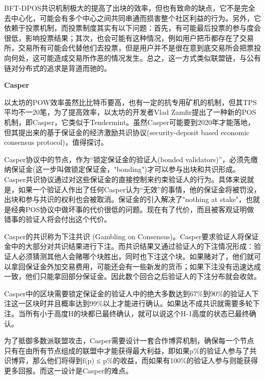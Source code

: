 \documentclass[a4paper,12pt]{article}
\begin{document}
BFT-DPOS共识机制极大的提高了出块的效率，但也有致命的缺点，它不是完全去中心化，可能会有多个中心之间共同串通而损害整个社区利益的行为。另外，它依赖于投票机制，而投票制度其实有以下问题：首先，有可能最后投票的参与度会很低，影响投票结果；其次，也会可能有这种情况，例如用户把币都存在了交易所，交易所有可能会代替他们去投票，但是用户并不是很在意到底交易所会把票投向何处，这可能造成交易所作恶的情况发生。总之，这一方式类似联盟链，与公有链对分布式的追求是背道而驰的。

\textbf{Casper}


以太坊的POW效率虽然比比特币要高，也有一定的抗专用矿机的机制，但其TPS平均不一20笔，为了提高效率，以太坊的开发者Vlad Zamfir\cite{VladZamfir}提出了一种新的POS机制，即Casper，它类似于Tendermint。虽然Casper可能要到2020年才能落地，但其提出来的基于保证金的经济激励共识协议(security-deposit based economic consensus protocol)，值得探讨。

Casper协议中的节点，作为“锁定保证金的验证人(bonded validators)”，必须先缴纳保证金(这一步叫做锁定保证金，"bonding")才可以参与出块和共识形成。Casper共识协议通过对这些保证金的直接控制来约束验证人的行为。具体来说就是，如果一个验证人作出了任何Casper认为“无效”的事情，他的保证金将被罚没，出块和参与共识的权利也会被取消。保证金的引入解决了"nothing at stake"，也就是经典POS协议中做坏事的代价很低的问题。现在有了代价，而且被客观证明做错事的验证人将会付出这个代价。

Casper的共识称为下注共识 (Gambling on Consensus)。Casper要求验证人将保证金中的大部分对共识结果进行下注。而共识结果又通过验证人的下注情况形成：验证人必须猜测其他人会赌哪个块胜出，同时也下注这个块。如果赌对了，他们就可以拿回保证金外加交易费用，可能还会有一些新发的货币；如果下注没有迅速达成一致，他们只能拿回部分保证金。因此数个回合之后验证人的下注分布就会收敛。

Casper中的区块需要锁定保证金的验证人中的绝大多数达到67\%到90\%的验证人下注这一区块时并且概率达到99\%以上才能进行确认。如果达不成共识就需要多轮下注。当所有小于高度H的块都已最终确认，就可以说这个H-1高度的状态已最终确认。


为了抵御多数派联盟攻击，Casper需要设计一套合作博弈机制，确保每一个节点只有在由所有节点组成的联盟中才能获得最大利益，即如果p\%的验证人参与了共识博弈，那么他们将得到f(p) ≤ p\%的收益，而如果有100\%的验证人参与则能获得更多回报。而这一设计是Casper的难点。
\end{document}
